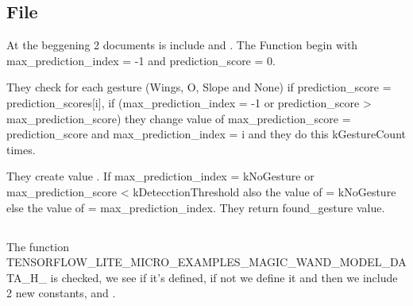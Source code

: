 \subsection{File }

At the beggening 2 documents is include  and . The Function  begin with max\_prediction\_index = -1 and prediction\_score = 0. 

\bigskip 

They check for each gesture (Wings, O, Slope and None) if prediction\_score = prediction\_scores[i], if (max\_prediction\_index = -1  or prediction\_score > max\_prediction\_score) they change value of max\_prediction\_score = prediction\_score and max\_prediction\_index = i and they do this kGestureCount times. 

\bigskip 

They create value . If max\_prediction\_index = kNoGesture or max\_prediction\_score < kDetecctionThreshold also the value of  = kNoGesture else the value of  = max\_prediction\_index. They return found\_gesture value. 

\bigskip

\begin{center}
    		
    \label{Magic Wand gesture predictor}
\end{center}



\subsection{}



The function  TENSORFLOW\_LITE\_MICRO\_EXAMPLES\_MAGIC\_WAND\_MODEL\_DATA\_H\_ is checked, we see if it's defined, if not we define it and then we include 2 new constants,  and .


\begin{center}
    		
    \label{Code:Magic Wand model data}
\end{center}


